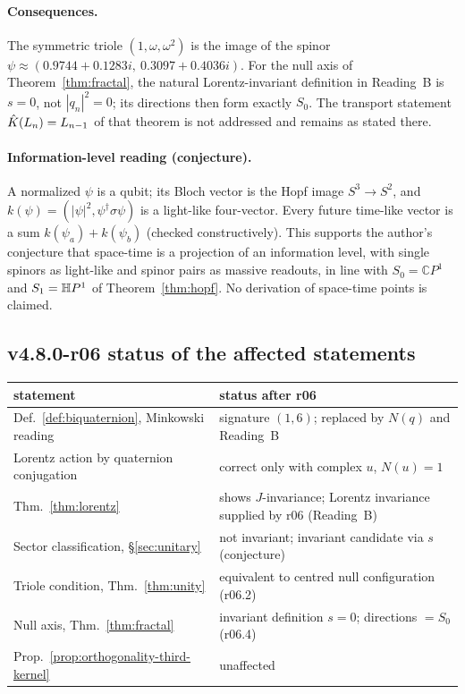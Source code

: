 \paragraph{Consequences.}
The symmetric triole \((1,\omega,\omega^2)\) is the image of the spinor
\(\psi\approx(0.9744+0.1283i,\ 0.3097+0.4036i)\).  For the null axis of
Theorem~\ref{thm:fractal}, the natural Lorentz-invariant definition in Reading~B is \(s=0\), not
\(|q_n|^2=0\); its directions then form exactly \(S_0\).  The transport statement
\(\hat{K}(L_n)=L_{n-1}\) of that theorem is not addressed and remains as stated there.

\paragraph{Information-level reading (conjecture).}
A normalized \(\psi\) is a qubit; its Bloch vector is the Hopf image \(S^3\to S^2\), and
\(k(\psi)=(|\psi|^2,\psi^\dagger\sigma\psi)\) is a light-like four-vector.  Every future time-like
vector is a sum \(k(\psi_a)+k(\psi_b)\) (checked constructively).  This supports the author's
conjecture that space-time is a projection of an information level, with single spinors as
light-like and spinor pairs as massive readouts, in line with
\(S_0=\mathbb CP^1\) and \(S_1=\mathbb{H} P^1\) of Theorem~\ref{thm:hopf}.  No derivation of space-time
points is claimed.

\subsection*{v4.8.0-r06 status of the affected statements}
\label{subsec:v480-r06-status}

\begin{center}
\small
\begin{tabular}{@{}>{\raggedright\arraybackslash}p{}>{\raggedright\arraybackslash}p{}@{}}
\toprule
statement & status after r06\\
\midrule
Def.~\ref{def:biquaternion}, Minkowski reading & signature \((1,6)\); replaced by \(N(q)\) and Reading~B\\
Lorentz action by quaternion conjugation & correct only with complex \(u\), \(N(u)=1\)\\
Thm.~\ref{thm:lorentz} & shows \(J\)-invariance; Lorentz invariance supplied by r06 (Reading~B)\\
Sector classification, \S\ref{sec:unitary} & not invariant; invariant candidate via \(s\) (conjecture)\\
Triole condition, Thm.~\ref{thm:unity} & equivalent to centred null configuration (r06.2)\\
Null axis, Thm.~\ref{thm:fractal} & invariant definition \(s=0\); directions \(=S_0\) (r06.4)\\
Prop.~\ref{prop:orthogonality-third-kernel} & unaffected\\
\bottomrule
\end{tabular}
\end{center}

